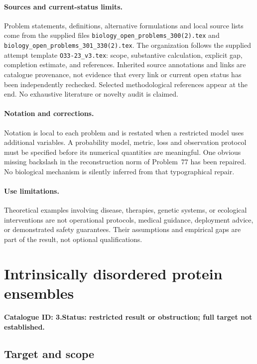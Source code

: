 \documentclass[11pt]{article}
\begin{document}
\paragraph{Sources and current-status limits.}
Problem statements, definitions, alternative formulations and local source lists
come from the supplied files
\texttt{biology\_open\_problems\_300(2).tex} and
\texttt{biology\_open\_problems\_301\_330(2).tex}.
The organization follows the supplied attempt template
\texttt{O33-23\_v3.tex}: scope, substantive calculation, explicit gap,
completion estimate, and references. Inherited source annotations and links are
catalogue provenance, not evidence that every link or current open status has
been independently rechecked. Selected methodological references appear at the
end. No exhaustive literature or novelty audit is claimed.

\paragraph{Notation and corrections.}
Notation is local to each problem and is restated when a restricted model uses
additional variables. A probability model, metric, loss and observation protocol
must be specified before its numerical quantities are meaningful. One obvious
missing backslash in the reconstruction norm of Problem~77 has been repaired.
No biological mechanism is silently inferred from that typographical repair.

\paragraph{Use limitations.}
Theoretical examples involving disease, therapies, genetic systems, or ecological
interventions are not operational protocols, medical guidance, deployment advice,
or demonstrated safety guarantees. Their assumptions and empirical gaps are part
of the result, not optional qualifications.

\setcounter{section}{2}
\section{Intrinsically disordered protein ensembles}
\label{prob:003}
\noindent\textbf{Catalogue ID: 3.}\quad \textbf{Status: restricted result or obstruction; full target not established.}
\subsection{Target and scope}
\end{document}
